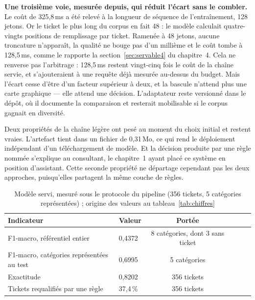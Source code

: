 \textbf{Une troisième voie, mesurée depuis, qui réduit l'écart sans le combler.} Le coût de
325,8\,ms a été relevé à la longueur de séquence de l'entraînement, 128 jetons. Or le ticket le
plus long du corpus en fait 48 : le modèle calculait quatre-vingts positions de remplissage par
ticket. Ramenée à 48 jetons, aucune troncature n'apparaît, la qualité ne bouge pas d'un millième et
le coût tombe à 128,5\,ms, comme le rapporte la section~\ref{sec:servable4} du chapitre~4. Cela ne
renverse pas l'arbitrage : 128,5\,ms restent vingt-cinq fois le coût de la chaîne servie, et
s'ajouteraient à une requête déjà mesurée au-dessus du budget. Mais l'écart cesse d'être d'un facteur
supérieur à deux, et la bascule n'attend plus une carte graphique — elle attend une décision.
L'adaptateur reste versionné dans le dépôt, où il documente la comparaison et resterait mobilisable
si le corpus gagnait en diversité.

Deux propriétés de la chaîne légère ont pesé au moment du choix initial et restent vraies.
L'artefact tient dans un fichier de 0,31\,Mo, ce qui rend le déploiement indépendant d'un
téléchargement de modèle. Et la décision produite par une règle nommée s'explique au consultant, le
chapitre~1 ayant placé ce système en position d'assistant. Cette seconde propriété ne départage
cependant pas les deux approches, puisqu'elles partagent la même couche de règles.

\begin{table}[!htbp]
\centering
\styletableau
\caption[Modèle servi, mesuré sous le protocole du pipeline]{Modèle servi, mesuré
sous le protocole du pipeline (356 tickets,
5 catégories représentées) ; origine des valeurs au tableau~\ref{tab:chiffres}}
\label{tab:prod}
\renewcommand{\arraystretch}{1.25}
\begin{tabular}{|Bp{6.2cm}|Cp{2.6cm}|Lp{4.4cm}|}
\hline
{}
\textbf{Indicateur} & \textbf{Valeur} & \textbf{Portée} \\
\hline
F1-macro, référentiel entier & 0,4372 & 8 catégories, dont 3 sans ticket \\
\hline
F1-macro, catégories représentées au test & 0,6995 & 5 catégories \\
\hline
Exactitude & 0,8202 & 356 tickets \\
\hline
Tickets requalifiés par une règle & 37,4\,\% & 356 tickets \\
\hline
\end{tabular}
\end{table}

